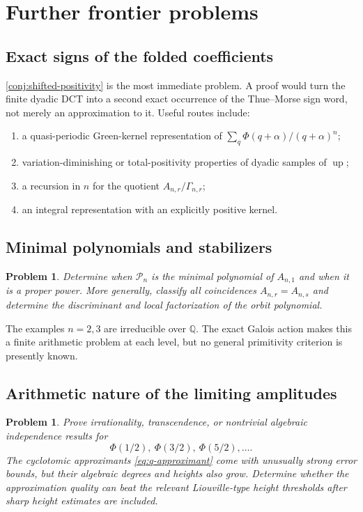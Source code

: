 \documentclass[11pt,oneside]{article}
\newtheorem{problem}[theorem]{Problem}
\theoremstyle{definition}
\theoremstyle{remark}
\newcommand{\Q}{\mathbb Q}
\newcommand{\Up}{\operatorname{up}}
\newcommand{\PhiU}{\Phi}
\begin{document}
\section{Further frontier problems}\label{sec:open}

\subsection{Exact signs of the folded coefficients}

\cref{conj:shifted-positivity} is the most immediate problem.  A proof would
turn the finite dyadic DCT into a second exact occurrence of the Thue--Morse sign
word, not merely an approximation to it.  Useful routes include:
\begin{enumerate}
 \item a quasi-periodic Green-kernel representation of
 $\sum_q\PhiU(q+\alpha)/(q+\alpha)^n$;
 \item variation-diminishing or total-positivity properties of dyadic samples of
 $\Up$;
 \item a recursion in $n$ for the quotient $A_{n,r}/\Gamma_{n,r}$;
 \item an integral representation with an explicitly positive kernel.
\end{enumerate}

\subsection{Minimal polynomials and stabilizers}

\begin{problem}\label{prob:minimal-polynomials}
Determine when $\mathcal P_n$ is the minimal polynomial of $A_{n,1}$ and when it
is a proper power.  More generally, classify all coincidences
$A_{n,r}=A_{n,s}$ and determine the discriminant and local factorization of the
orbit polynomial.
\end{problem}

The examples $n=2,3$ are irreducible over $\Q$.  The exact Galois action makes
this a finite arithmetic problem at each level, but no general primitivity
criterion is presently known.

\subsection{Arithmetic nature of the limiting amplitudes}

\begin{problem}\label{prob:amplitude-arithmetic}
Prove irrationality, transcendence, or nontrivial algebraic independence results
for
\[
 \PhiU(1/2),\ \PhiU(3/2),\ \PhiU(5/2),\ldots.
\]
The cyclotomic approximants \eqref{eq:q-approximant} come with unusually strong
error bounds, but their algebraic degrees and heights also grow.  Determine
whether the approximation quality can beat the relevant Liouville-type height
thresholds after sharp height estimates are included.
\end{problem}
\end{document}
